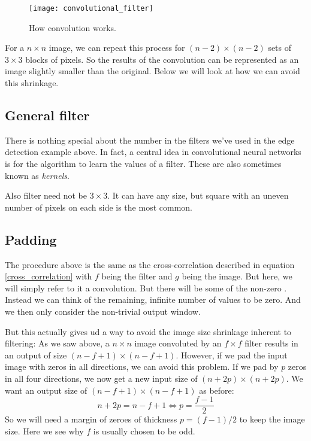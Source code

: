 \documentclass[12pt, a4paper]{article}
\numberwithin{equation}{section}
\begin{document}
\begin{figure}
\centering
\texttt{[image: convolutional\_filter]}
\caption{How convolution works.}
\label{fig:convolutional_filter}
\end{figure}

For a $n\times n$ image, we can repeat this process for $(n-2)\times(n-2)$ sets of $3\times 3$ blocks of pixels. So the results of the convolution can be represented as an image slightly smaller than the original. Below we will look at how we can avoid this shrinkage.

\subsection{General filter}
There is nothing special about the number in the filters we've used in the edge detection example above. In fact, a central idea in convolutional neural networks is for the algorithm to learn the values of a filter. These are also sometimes known as \textit{kernels}.

Also filter need not be $3\times 3$. It can have any size, but square with an uneven number of pixels on each side is the most common.

\subsection{Padding}
The procedure above is the same as the cross-correlation described in equation \ref{cross_correlation} with $f$ being the filter and $g$ being the image. But here, we will simply refer to it a convolution. But there will be some of the non-zero . Instead we can think of the remaining, infinite number of values to be zero. And we then only consider the non-trivial output window.

But this actually gives ud a way to avoid the image size shrinkage inherent to filtering: As we saw above, a $n\times n$ image convoluted by an $f\times f$ filter results in an output of size $(n-f+1)\times(n-f+1)$. However, if we pad the input image with zeros in all directions, we can avoid this problem. If we pad by $p$ zeros in all four directions, we now get a new input size of $(n+2p)\times(n+2p)$. We want an output size of $(n-f+1)\times(n-f+1)$ as before:
\begin{equation}
n+2p=n-f+1\Leftrightarrow p=\frac{f-1}{2}
\end{equation}
So we will need a margin of zeroes of thickness $p=(f-1)/2$ to keep the image size. Here we see why $f$ is usually chosen to be odd.
\end{document}
